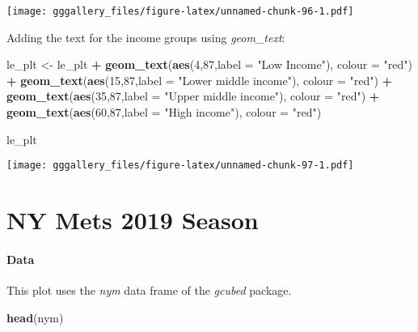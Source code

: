 \documentclass[]{book}
\newenvironment{Shaded}{\begin{snugshade}}{\end{snugshade}}
\newcommand{\DataTypeTok}[1]{\textcolor[rgb]{0.13,0.29,0.53}{#1}}
\newcommand{\DecValTok}[1]{\textcolor[rgb]{0.00,0.00,0.81}{#1}}
\newcommand{\KeywordTok}[1]{\textcolor[rgb]{0.13,0.29,0.53}{\textbf{#1}}}
\newcommand{\NormalTok}[1]{#1}
\newcommand{\OperatorTok}[1]{\textcolor[rgb]{0.81,0.36,0.00}{\textbf{#1}}}
\newcommand{\StringTok}[1]{\textcolor[rgb]{0.31,0.60,0.02}{#1}}
\begin{document}
\texttt{[image: gggallery\_files/figure-latex/unnamed-chunk-96-1.pdf]}

Adding the text for the income groups using \emph{geom\_text}:

\begin{Shaded}
\begin{Highlighting}[]
\NormalTok{le_plt <-}\StringTok{ }\NormalTok{le_plt }\OperatorTok{+}\StringTok{ }
\StringTok{  }\KeywordTok{geom_text}\NormalTok{(}\KeywordTok{aes}\NormalTok{(}\DecValTok{4}\NormalTok{,}\DecValTok{87}\NormalTok{,}\DataTypeTok{label =} \StringTok{"Low Income"}\NormalTok{), }\DataTypeTok{colour =} \StringTok{"red"}\NormalTok{) }\OperatorTok{+}
\StringTok{  }\KeywordTok{geom_text}\NormalTok{(}\KeywordTok{aes}\NormalTok{(}\DecValTok{15}\NormalTok{,}\DecValTok{87}\NormalTok{,}\DataTypeTok{label =} \StringTok{"Lower middle income"}\NormalTok{), }\DataTypeTok{colour =} \StringTok{"red"}\NormalTok{) }\OperatorTok{+}
\StringTok{  }\KeywordTok{geom_text}\NormalTok{(}\KeywordTok{aes}\NormalTok{(}\DecValTok{35}\NormalTok{,}\DecValTok{87}\NormalTok{,}\DataTypeTok{label =} \StringTok{"Upper middle income"}\NormalTok{), }\DataTypeTok{colour =} \StringTok{"red"}\NormalTok{) }\OperatorTok{+}
\StringTok{  }\KeywordTok{geom_text}\NormalTok{(}\KeywordTok{aes}\NormalTok{(}\DecValTok{60}\NormalTok{,}\DecValTok{87}\NormalTok{,}\DataTypeTok{label =} \StringTok{"High income"}\NormalTok{), }\DataTypeTok{colour =} \StringTok{"red"}\NormalTok{)}

\NormalTok{le_plt }
\end{Highlighting}
\end{Shaded}

\texttt{[image: gggallery\_files/figure-latex/unnamed-chunk-97-1.pdf]}

\hypertarget{metsbar}{%
\chapter*{NY Mets 2019 Season}\label{metsbar}}

\hypertarget{metsbardata}{%
\subsubsection*{Data}\label{metsbardata}}

This plot uses the \emph{nym} data frame of the \emph{gcubed} package.

\begin{Shaded}
\begin{Highlighting}[]
\KeywordTok{head}\NormalTok{(nym)}
\end{Highlighting}
\end{Shaded}
\end{document}

